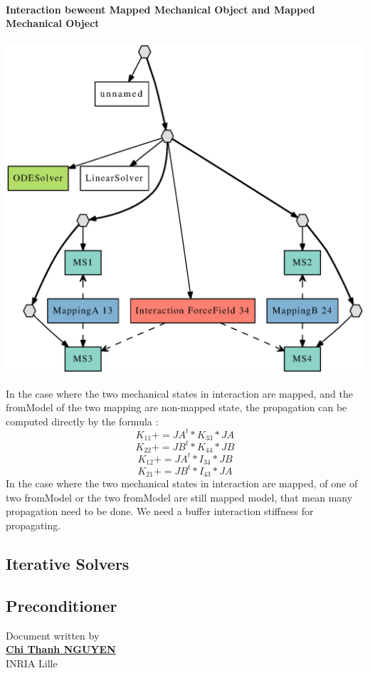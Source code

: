 \documentclass[a4paper,10pt]{article}
\begin{document}
\paragraph{Interaction beweent Mapped Mechanical Object and Mapped Mechanical Object}
\begin{center}
  \includegraphics[scale=0.3]{interaction_Mapped_Mapped}
\end{center}
In the case where the two mechanical states in interaction are mapped, and the fromModel of the two mapping are non-mapped state, the propagation can be computed directly by the formula :
\[
K_{11} += JA^t * K_{33} * JA 
\]
\[
K_{22} += JB^t * K_{44} * JB 
\]
\[
K_{12} += JA^t * I_{34} * JB 
\]
\[
K_{21} += JB^t * I_{43} * JA 
\]
In the case where the two mechanical states in interaction are mapped, of one of two fromModel or the two fromModel are still mapped model, that mean many propagation need to be done. We need a buffer interaction stiffness for propagating.
\subsection{Iterative Solvers }
\subsection{Preconditioner }



						      \begin{flushright}
						      Document written by \\
						      \href{mailto:chi-thanh.nguyen@inria.fr}{{\textbf {Chi Thanh NGUYEN}}} \\
						      INRIA Lille
						      \end{flushright}

%
%
\end{document}
